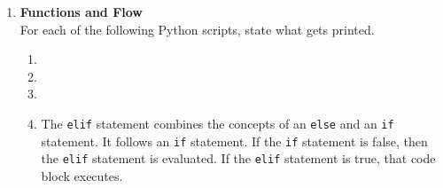 \documentclass{article}
\begin{document}
\begin{enumerate}
\begin{enumerate}
\setcounter{enumii}{1}
\item 
\end{enumerate}

\begin{enumerate}
\setcounter{enumii}{2}
\item 
\end{enumerate}

\begin{enumerate}
\setcounter{enumii}{3}
\item 
\end{enumerate}

\begin{enumerate}
\setcounter{enumii}{4}
\item 
\end{enumerate}


\item \textbf{Functions and Flow} \\
For each of the following Python scripts, state what gets printed.

\begin{enumerate}
\item 
\end{enumerate}

\begin{enumerate}
\setcounter{enumii}{1}
\item 
\end{enumerate}

\begin{enumerate}
\setcounter{enumii}{2}
\item 
\end{enumerate}

\begin{enumerate}
\setcounter{enumii}{3}
\item The \texttt{elif} statement combines the concepts of an \texttt{else} and an \texttt{if} statement.  It follows an \texttt{if} statement.  If the \texttt{if} statement is false, then the \texttt{elif} statement is evaluated.  If the \texttt{elif} statement is true, that code block executes. \\


\end{enumerate}


\end{enumerate}
\end{document}

